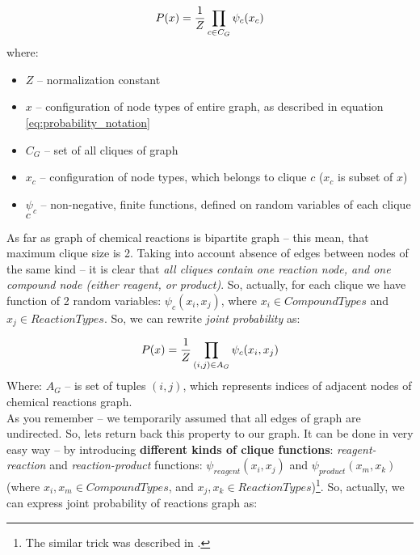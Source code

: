 \documentclass[10pt]{article}
\begin{document}
\begin{equation}
P(x) = {1 \over Z} \prod_{c \in C_G} \psi_{c}(x_c)
\end{equation}
where:
\begin{itemize} 
    \setlength \itemsep{0em}
    \item $Z$ -- normalization constant
    \item $x$ -- configuration of node types of entire graph, as described in equation \eqref{eq:probability_notation}
    \item $C_G$ -- set of all cliques of graph
    \item $x_c$ -- configuration of node types, which belongs to clique $c$ ($x_c$ is subset of $x$)
    \item $\psi_{c}$ -- non-negative, finite functions, defined on random variables of each clique $c$
\end{itemize}

\noindent As far as graph of chemical reactions is bipartite graph -- this mean, that maximum clique size is 2. Taking into account absence of edges between nodes of the same kind -- it is clear that \emph{all cliques contain one reaction node, and one compound node (either reagent, or product)}. So, actually, for each clique we have function of 2 random variables: $\psi_c(x_i, x_j)$, where $x_i \in CompoundTypes$ and $x_j \in ReactionTypes$. So, we can rewrite \emph{joint probability} as:

\begin{equation} \label{eq:pairwise_gibbs_distribution}
P(x) = {1 \over Z} \prod_{(i,j) \in A_G} \psi_{c}(x_i, x_j)
\end{equation}
Where: $A_G$ -- is set of tuples $(i,j)$, which represents indices of adjacent nodes of chemical reactions graph. \\

As you remember -- we temporarily assumed that all edges of graph are undirected. So, lets return back this property to our graph. It can be done in very easy way -- by introducing \textbf{different kinds of clique functions}: \emph{reagent-reaction} and \emph{reaction-product} functions: $\psi_{reagent}(x_i, x_j)$ and $\psi_{product}(x_m, x_k)$ (where $x_i, x_m \in CompoundTypes$, and $x_j, x_k \in ReactionTypes$)\footnote{The similar trick was described in \cite{fraud_detection}.}. So, actually, we can express joint probability of reactions graph as:
\end{document}
